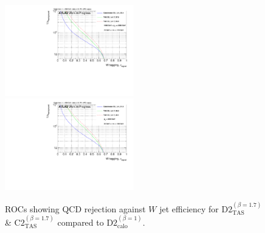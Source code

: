 \begin{figure}
\bigskip
\includegraphics[width=0.5\textwidth]{sascha_input/Appendix/W_best/ROC_ALL_h_recoJet_D2_bin5.pdf} \hspace{1mm}
\includegraphics[width=0.5\textwidth]{sascha_input/Appendix/W_best/ROC_ALL_h_recoJet_D2_bin6.pdf}
\caption{\footnotesize{ROCs showing QCD rejection against $W$ jet efficiency for $\text{D2}_{\text{TAS}}^{(\beta=1.7)}$ \& $\text{C2}_{\text{TAS}}^{(\beta=1.7)}$ compared to $\text{D2}_{\text{calo}}^{(\beta=1)}$. }}
\end{figure}

